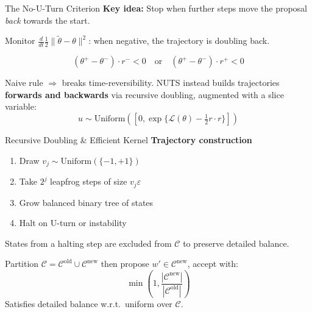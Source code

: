 \documentclass{beamer}
\begin{document}
\begin{frame}{The No-U-Turn Criterion}
  \textbf{Key idea:} Stop when further steps move the proposal \emph{back} towards the start.

  \vspace{0.2cm}
  Monitor $\tfrac{d}{dt}\tfrac{1}{2}\|\tilde\theta - \theta\|^2$: when negative, the trajectory is doubling back.

  \vspace{0.15cm}
  \begin{tcolorbox}[keybox, title={U-turn condition on leaves $(\theta^-,r^-)$, $(\theta^+,r^+)$}]
    \[(\theta^+ - \theta^-)\cdot r^- < 0 \quad\text{or}\quad (\theta^+ - \theta^-)\cdot r^+ < 0\]
  \end{tcolorbox}

  \vspace{0.2cm}
  Naive rule $\Rightarrow$ breaks time-reversibility. NUTS instead builds trajectories \textbf{forwards and backwards} via recursive doubling, augmented with a slice variable:
  \[u \sim \mathrm{Uniform}\!\left([0,\exp\{\mathcal{L}(\theta)-\tfrac{1}{2}r\cdot r\}]\right)\]
\end{frame}

\begin{frame}{Recursive Doubling \& Efficient Kernel}
    \textbf{Trajectory construction}
    \begin{enumerate}
      \item Draw $v_j \sim \mathrm{Uniform}(\{-1,+1\})$
      \item Take $2^j$ leapfrog steps of size $v_j\varepsilon$
      \item Grow balanced binary tree of states
      \item Halt on U-turn or instability
    \end{enumerate}
    States from a halting step are excluded from $\mathcal{C}$ to preserve detailed balance.

    \begin{tcolorbox}[keybox, title={Memory: $\mathcal{O}(2^j)\to\mathcal{O}(j)$}]
      Partition $\mathcal{C} = \mathcal{C}^{\mathrm{old}} \cup \mathcal{C}^{\mathrm{new}}$ then propose $w'\!\in\!\mathcal{C}^{\mathrm{new}}$, accept with:
      \[\min\!\left(1,\frac{|\mathcal{C}^{\mathrm{new}}|}{|\mathcal{C}^{\mathrm{old}}|}\right)\]
      Satisfies detailed balance w.r.t.\ uniform over $\mathcal{C}$.
    \end{tcolorbox}
\end{frame}
\end{document}
